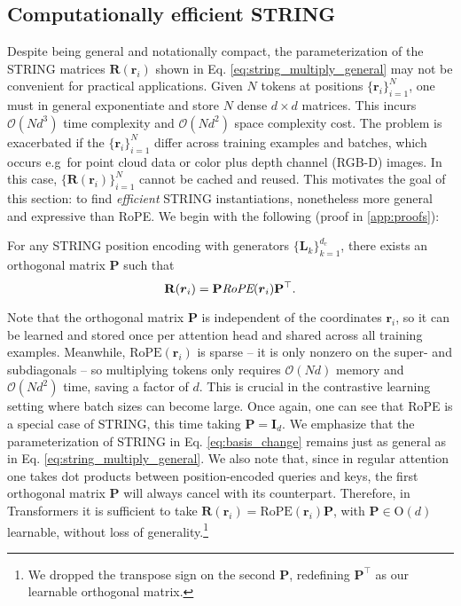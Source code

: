 \subsection{Computationally efficient STRING} \label{sec:efficient_string}
Despite being general and notationally compact, the parameterization of the STRING matrices $\mathbf{R}(\mathbf{r}_i)$ shown in Eq. \ref{eq:string_multiply_general} may not be convenient for practical applications.
Given $N$ tokens at positions $\{\mathbf{r}_i\}_{i=1}^N$, one must in general exponentiate and store $N$ dense $d\times d$ matrices.
This incurs $\mathcal{O}(Nd^3)$ time complexity and $\mathcal{O}(Nd^2)$ space complexity cost.
The problem is exacerbated if the $\{\mathbf{r}_i\}_{i=1}^N$ differ across training examples and batches, which occurs e.g~for point cloud data or color plus depth channel (RGB-D) images. 
In this case, $\{\mathbf{R}(\mathbf{r}_i)\}_{i=1}^N$ cannot be cached and reused.
This motivates the goal of this section: to find \emph{efficient} STRING instantiations, nonetheless more general and expressive than RoPE.
We begin with the following (proof in \cref{app:proofs}):
\begin{theorem}\label{thm:basis_change}
For any STRING position encoding with generators $\{\mathbf{L}_k\}_{k=1}^{d_c}$, there exists an orthogonal matrix $\mathbf{P}$ such that \vspace{-1mm}
\begin{equation} \label{eq:basis_change}
    \mathbf{R}(\boldsymbol{r}_i) = \mathbf{P} \emph{\textrm{RoPE}}(\boldsymbol{r}_i) \mathbf{P}^\top.
\end{equation}
\end{theorem} \vspace{-2mm}
Note that the orthogonal matrix $\mathbf{P}$ is independent of the coordinates $\mathbf{r}_i$, so it can be learned and stored once per attention head and shared across all training examples. 
Meanwhile, ${\textrm{RoPE}}(\boldsymbol{r}_i)$ is sparse -- it is only nonzero on the super- and subdiagonals -- so multiplying tokens only requires $\mathcal{O}(Nd)$ memory and $\mathcal{O}(Nd^2)$ time, saving a factor of $d$. 
This is crucial in the contrastive learning setting where batch sizes can become large. 
Once again, one can see that RoPE is a special case of STRING, this time taking $\mathbf{P}=\mathbf{I}_d$.
We emphasize that the parameterization of STRING in Eq. \ref{eq:basis_change} remains just as general as in Eq. \ref{eq:string_multiply_general}.
We also note that, since in regular attention one takes dot products between position-encoded queries and keys, the first orthogonal matrix $\mathbf{P}$ will always cancel with its counterpart. 
Therefore, in Transformers it is sufficient to take $\mathbf{R}(\boldsymbol{r}_i) = \textrm{RoPE}(\boldsymbol{r}_i) \mathbf{P}$, with $\mathbf{P} \in \textrm{O}(d)$ learnable, without loss of generality.\footnote{We dropped the transpose sign on the second $\mathbf{P}$, redefining $\mathbf{P}^\top$ as our learnable orthogonal matrix.}    

